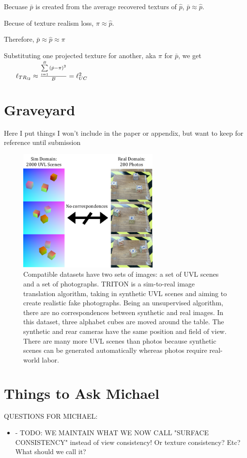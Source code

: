 \documentclass{article}
\begin{document}
		Becuase $\bar{p}$ is created from the average recovered texturs of $\hat{p}$, $\bar{p} \approx \hat{p}$.

		Becuse of texture realism loss, $\pi \approx \hat{p}$.

		Therefore, $\bar{p} \approx \hat{p} \approx \pi$



		Substituting one projected texture for another, aka $\pi$ for $\bar{p}$, we get 
		$ \
		\
		\
		\
		\ \ell_{TR_{l2}}
		\approx
		\frac{\sum\limits_{i=1}^B {
			\left( \hat{p}-\pi  \right)^2
			}}{B} = \ell_{UC}^2
		$


\section*{Graveyard}

Here I put things I won't include in the paper or appendix, but want to keep for reference until submission

\begin{figure}[H]
	\begin{center}
		\includegraphics[width=200pt]{../images/dataset_explanation.pdf}
	\end{center}
	\caption{
		Compatible datasets have two sets of images: a set of UVL scenes and a set of photographs.
		TRITON is a sim-to-real image translation algorithm, taking in synthetic UVL scenes and aiming to create realistic fake photographs. 
		Being an unsupervised algorithm, there are no correspondences between synthetic and real images.
		In this dataset, three alphabet cubes are moved around the table. 
		The synthetic and rear cameras have the same position and field of view.
		There are many more UVL scenes than photos because synthetic scenes can be generated automatically whereas photos require real-world labor.
		}
	\label{fig:dataset_explanation}
\end{figure}


\section*{Things to Ask Michael}


QUESTIONS FOR MICHAEL:
\begin{itemize}
	\item - TODO: WE MAINTAIN WHAT WE NOW CALL "SURFACE CONSISTENCY" instead of view consistency! Or texture consistency? Etc? What should we call it?
\end{itemize}
\end{document}
